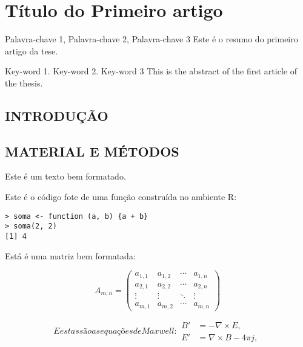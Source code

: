 \artigotrue
\chapter{Título do Primeiro artigo}
\label{chap:chapter01}

\begin{chapterabstractPOR}{Palavra-chave 1, Palavra-chave 2, Palavra-chave 3}
Este é o resumo do primeiro artigo da tese.
\end{chapterabstractPOR}

\begin{chapterabstractENG}{Key-word 1. Key-word 2. Key-word 3}
This is the abstract of the first article of the thesis.
\end{chapterabstractENG}

\section{INTRODUÇÃO}

\blindtext[2]

\section{MATERIAL E MÉTODOS}

Este é um texto bem formatado. \blindtext[1]

Este é o código fote de uma função construída no ambiente R:

\begin{verbatim}
> soma <- function (a, b) {a + b}
> soma(2, 2)
[1] 4
\end{verbatim}

Está é uma matriz bem formatada:

\begin{equation}
  A_{m,n} =
 \begin{pmatrix}
  a_{1,1} & a_{1,2} & \cdots & a_{1,n} \\
  a_{2,1} & a_{2,2} & \cdots & a_{2,n} \\
  \vdots  & \vdots  & \ddots & \vdots  \\
  a_{m,1} & a_{m,2} & \cdots & a_{m,n}
 \end{pmatrix}
\end{equation}

\begin{subequations}\label{eq:maxwell}
E estas são as equações de Maxwell:
\begin{align}
        B'&=-\nabla \times E,\\
        E'&=\nabla \times B - 4\pi j,
\end{align}
\end{subequations}

